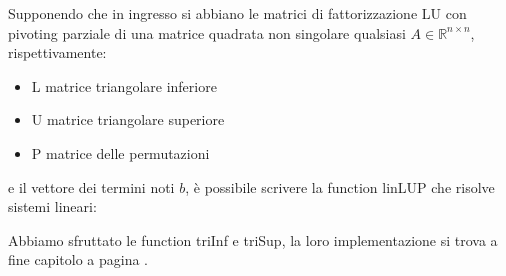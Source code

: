 \begin{flushleft}
Supponendo che in ingresso si abbiano le matrici di fattorizzazione LU con pivoting parziale di una matrice quadrata non singolare qualsiasi $A \in \mathbb{R}^{n \times n}$, rispettivamente:
\begin{itemize}
    \item L matrice triangolare inferiore
    \item U matrice triangolare superiore 
    \item P matrice delle permutazioni
\end{itemize}
e il vettore dei termini noti $b$, è possibile scrivere la function linLUP che risolve sistemi lineari:

Abbiamo sfruttato le function triInf e triSup, la loro implementazione si trova a fine capitolo a pagina \pageref{functcap3}.
\end{flushleft}
